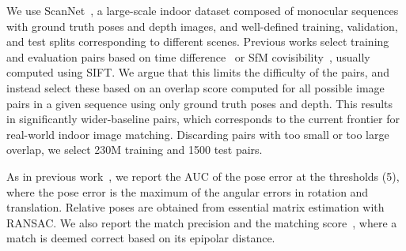 \documentclass[10pt,twocolumn,letterpaper]{article}
\newcommand{\PAR}[1]{\vskip4pt \noindent{\bf #1~}}
\renewcommand{\*}[1]{\mathbf{#1}}
\newcommand{\0}{\phantom{0}}
\begin{document}
\PAR{Dataset:} We use ScanNet~\cite{dai2017scannet}, a large-scale indoor dataset composed of monocular sequences with ground truth poses and depth images, and well-defined training, validation, and test splits corresponding to different scenes.
Previous works select training and evaluation pairs based on time difference~\cite{ono2018lf, detone2018self} or SfM covisibility~\cite{moo2018learning, zhang2019learning, brachmann2019neural}, usually computed using SIFT. We argue that this limits the difficulty of the pairs, and instead select these based on an overlap score computed for all possible image pairs in a given sequence using only ground truth poses and depth. This results in significantly wider-baseline pairs, which corresponds to the current frontier for real-world indoor image matching.
Discarding pairs with too small or too large overlap, we select 230M training and 1500 test pairs.

\PAR{Metrics:} As in previous work~\cite{moo2018learning, zhang2019learning, brachmann2019neural}, we report the AUC of the pose error at the thresholds (5\degree), where the pose error is the maximum of the angular errors in rotation and translation. Relative poses are obtained from essential matrix estimation with RANSAC. We also report the match precision and the matching score~\cite{superpoint, yi2016lift}, where a match is deemed correct based on its epipolar distance.
\end{document}

